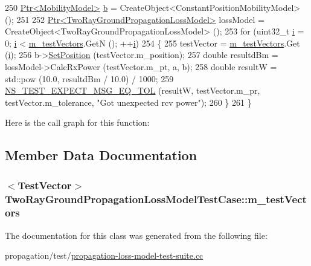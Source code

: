 \begin{DoxyCode}
250   \hyperlink{classns3_1_1Ptr}{Ptr<MobilityModel>} \hyperlink{buildings__pathloss_8m_a21ad0bd836b90d08f4cf640b4c298e7c}{b} = CreateObject<ConstantPositionMobilityModel> (); 
251 
252   \hyperlink{classns3_1_1Ptr}{Ptr<TwoRayGroundPropagationLossModel>} lossModel = 
      CreateObject<TwoRayGroundPropagationLossModel> (); 
253   \textcolor{keywordflow}{for} (uint32\_t \hyperlink{bernuolliDistribution_8m_a6f6ccfcf58b31cb6412107d9d5281426}{i} = 0; \hyperlink{bernuolliDistribution_8m_a6f6ccfcf58b31cb6412107d9d5281426}{i} < \hyperlink{classTwoRayGroundPropagationLossModelTestCase_ab0bd335163cae1eb85b9947c853e28a5}{m\_testVectors}.GetN (); ++\hyperlink{bernuolliDistribution_8m_a6f6ccfcf58b31cb6412107d9d5281426}{i})
254     \{
255       testVector = \hyperlink{classTwoRayGroundPropagationLossModelTestCase_ab0bd335163cae1eb85b9947c853e28a5}{m\_testVectors}.Get (\hyperlink{bernuolliDistribution_8m_a6f6ccfcf58b31cb6412107d9d5281426}{i});
256       b->\hyperlink{classns3_1_1MobilityModel_ac584b3d5a309709d2f13ed6ada1e7640}{SetPosition} (testVector.m\_position);
257       \textcolor{keywordtype}{double} resultdBm = lossModel->CalcRxPower (testVector.m\_pt, a, b);
258       \textcolor{keywordtype}{double} resultW = std::pow (10.0, resultdBm / 10.0) / 1000;
259       \hyperlink{group__testing_ga7927b376d1fed5e576c7a3d69d26e8a0}{NS\_TEST\_EXPECT\_MSG\_EQ\_TOL} (resultW, testVector.m\_pr, testVector.m\_tolerance,
       \textcolor{stringliteral}{"Got unexpected rcv power"});
260     \}
261 \}
\end{DoxyCode}


Here is the call graph for this function\+:




\subsection{Member Data Documentation}
\subsubsection[{\texorpdfstring{m\+\_\+test\+Vectors}{m_testVectors}}]{$<${\bf Test\+Vector}$>$ Two\+Ray\+Ground\+Propagation\+Loss\+Model\+Test\+Case\+::m\+\_\+test\+Vectors\hspace{0.3cm}{\ttfamily [private]}}\hypertarget{classTwoRayGroundPropagationLossModelTestCase_ab0bd335163cae1eb85b9947c853e28a5}{}\label{classTwoRayGroundPropagationLossModelTestCase_ab0bd335163cae1eb85b9947c853e28a5}


The documentation for this class was generated from the following file\+:\begin{DoxyCompactItemize}
\item 
propagation/test/\hyperlink{propagation-loss-model-test-suite_8cc}{propagation-\/loss-\/model-\/test-\/suite.\+cc}\end{DoxyCompactItemize}
